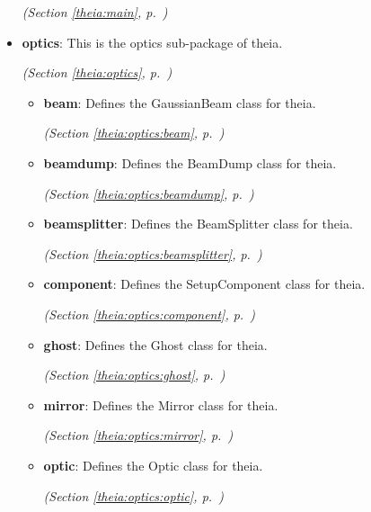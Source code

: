 \begin{itemize}
  \textit{(Section \ref{theia:main}, p.~\pageref{theia:main})}

\item \textbf{optics}: This is the optics sub-package of theia.



  \textit{(Section \ref{theia:optics}, p.~\pageref{theia:optics})}

  \begin{itemize}
\setlength{\parskip}{0ex}
    \item \textbf{beam}: Defines the GaussianBeam class for theia.



  \textit{(Section \ref{theia:optics:beam}, p.~\pageref{theia:optics:beam})}

    \item \textbf{beamdump}: Defines the BeamDump class for theia.



  \textit{(Section \ref{theia:optics:beamdump}, p.~\pageref{theia:optics:beamdump})}

    \item \textbf{beamsplitter}: Defines the BeamSplitter class for theia.



  \textit{(Section \ref{theia:optics:beamsplitter}, p.~\pageref{theia:optics:beamsplitter})}

    \item \textbf{component}: Defines the SetupComponent class for theia.



  \textit{(Section \ref{theia:optics:component}, p.~\pageref{theia:optics:component})}

    \item \textbf{ghost}: Defines the Ghost class for theia.



  \textit{(Section \ref{theia:optics:ghost}, p.~\pageref{theia:optics:ghost})}

    \item \textbf{mirror}: Defines the Mirror class for theia.



  \textit{(Section \ref{theia:optics:mirror}, p.~\pageref{theia:optics:mirror})}

    \item \textbf{optic}: Defines the Optic class for theia.



  \textit{(Section \ref{theia:optics:optic}, p.~\pageref{theia:optics:optic})}


\end{itemize}
\end{itemize}
